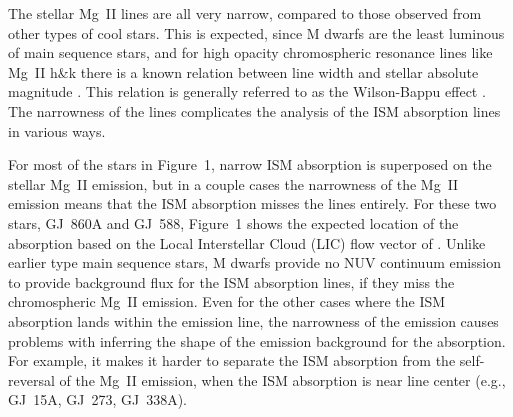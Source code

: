 \documentclass[preprint]{aastex}
\begin{document}
     The stellar Mg~II lines are all very narrow, compared to those observed
from other types of cool stars.  This is expected, since M dwarfs are
the least luminous of main sequence stars, and for high opacity
chromospheric resonance lines like Mg~II h\&k there is a known relation
between line width and stellar absolute magnitude \citep[e.g.,][]{ac01}.
This relation is generally referred to as the
Wilson-Bappu effect \citep{ocw57}.  The narrowness of the lines
complicates the analysis of the ISM absorption lines in various ways.

     For most of the stars in Figure~1, narrow ISM absorption is superposed
on the stellar Mg~II emission, but in a couple cases the narrowness of the
Mg~II emission means that the ISM absorption misses the lines entirely.
For these two stars, GJ~860A and GJ~588, Figure~1 shows the expected
location of the absorption based on the Local Interstellar Cloud (LIC) flow
vector of \citet{sr08}.  Unlike earlier type main sequence stars,
M dwarfs provide no NUV continuum emission to provide background flux for
the ISM absorption lines, if they miss the chromospheric Mg~II emission.
Even for the other cases where the ISM absorption lands within the emission
line, the narrowness of the emission causes problems with inferring the
shape of the emission background for the absorption.  For example,
it makes it harder to separate the ISM absorption from the self-reversal
of the Mg~II emission, when the ISM absorption is near line center
(e.g., GJ~15A, GJ~273, GJ~338A).
\end{document}
